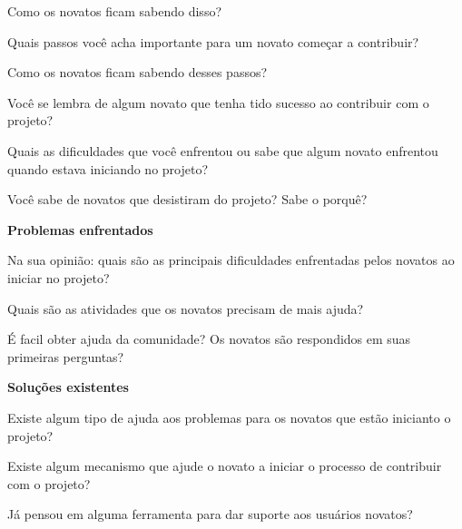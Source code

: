 \begin{anexosenv}
Como os novatos ficam sabendo disso?

Quais passos você acha importante para um novato começar a contribuir?

Como os novatos ficam sabendo desses passos?

Você se lembra de algum novato que tenha tido sucesso ao contribuir com o projeto?

Quais as dificuldades que você enfrentou ou sabe que algum novato enfrentou quando 
estava iniciando no projeto?

Você sabe de novatos que desistiram do projeto? Sabe o porquê?

\textbf{Problemas enfrentados}

Na sua opinião: quais são as principais dificuldades enfrentadas pelos novatos ao iniciar 
no projeto? 

Quais são as atividades que os novatos precisam de mais ajuda? 

É facil obter ajuda da comunidade? Os novatos são respondidos em suas primeiras perguntas?

\textbf{Soluções existentes}

Existe algum tipo de ajuda aos problemas para os novatos que estão inicianto o projeto?

Existe algum mecanismo que ajude o novato a iniciar o processo de contribuir com o projeto?

Já pensou em alguma ferramenta para dar suporte aos usuários novatos?


\end{anexosenv}

